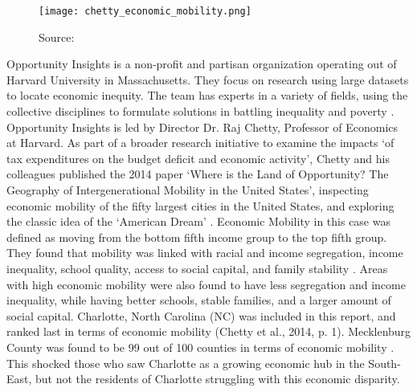 
\begin{figure}
    \caption{Source: \cite{opportunityinsights}}
    \texttt{[image: chetty\_economic\_mobility.png]}
    \label{fig1}
\end{figure}






Opportunity Insights is a non-profit and partisan organization operating out of Harvard University in Massachusetts. They focus on research using large datasets to locate economic inequity. 
The team has experts in a variety of fields, using the collective disciplines to formulate solutions in battling inequality and poverty \parencite{opportunityinsights}.
Opportunity Insights is led by Director Dr. Raj Chetty, Professor of Economics at Harvard. 
As part of a broader research initiative to examine the impacts `of  tax  expenditures  on  the  budget  deficit  and  economic  activity', Chetty and his colleagues published the 2014 paper `Where is the Land of Opportunity? The Geography of Intergenerational Mobility in the United States', inspecting economic mobility of the fifty largest cities in the United States, and exploring the classic idea of the `American Dream' \parencite{opportunityinsights, chetty2014}.
Economic Mobility in this case was defined as moving from the bottom fifth income group to the top fifth group. 
They found that mobility was linked with racial and income segregation, income inequality, school quality, access to social capital, and family stability \parencite{chetty2014}.
Areas with high economic mobility were also found to have less segregation and income inequality, while having better schools, stable families, and a larger amount of social capital\parencite{chetty2014}.
Charlotte, North Carolina (NC) was included in this report, and ranked last in terms of economic mobility (Chetty et al., 2014, p. 1). Mecklenburg County was found to be 99 out of 100 counties in terms of economic mobility \parencite{opportunityinsights}. This shocked those who saw Charlotte as a growing economic hub in the South-East, but not the residents of Charlotte struggling with this economic disparity. 


